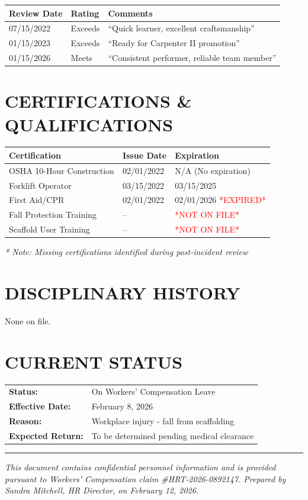 \documentclass[11pt]{article}
\begin{document}
\begin{tabular}{@{}p{3cm}p{3cm}p{8cm}@{}}
\toprule
\textbf{Review Date} & \textbf{Rating} & \textbf{Comments} \\
\midrule
07/15/2022 & Exceeds & ``Quick learner, excellent craftsmanship'' \\
01/15/2023 & Exceeds & ``Ready for Carpenter II promotion'' \\
01/15/2026 & Meets & ``Consistent performer, reliable team member'' \\
\bottomrule
\end{tabular}

\section*{CERTIFICATIONS \& QUALIFICATIONS}

\begin{tabular}{@{}p{6cm}p{4cm}p{4cm}@{}}
\toprule
\textbf{Certification} & \textbf{Issue Date} & \textbf{Expiration} \\
\midrule
OSHA 10-Hour Construction & 02/01/2022 & N/A (No expiration) \\
Forklift Operator & 03/15/2022 & 03/15/2025 \\
First Aid/CPR & 02/01/2022 & 02/01/2026 \textcolor{red}{*EXPIRED*} \\
Fall Protection Training & -- & \textcolor{red}{*NOT ON FILE*} \\
Scaffold User Training & -- & \textcolor{red}{*NOT ON FILE*} \\
\bottomrule
\end{tabular}

\vspace{0.5em}
\small\textit{* Note: Missing certifications identified during post-incident review}

\section*{DISCIPLINARY HISTORY}

None on file.

\section*{CURRENT STATUS}

\begin{tabular}{@{}p{4cm}p{10cm}@{}}
\textbf{Status:} & On Workers' Compensation Leave \\
\textbf{Effective Date:} & February 8, 2026 \\
\textbf{Reason:} & Workplace injury - fall from scaffolding \\
\textbf{Expected Return:} & To be determined pending medical clearance \\
\end{tabular}

\vspace{2em}

\hrule

\vspace{1em}

\small\textit{This document contains confidential personnel information and is provided pursuant to Workers' Compensation claim \#HRT-2026-0892147. Prepared by Sandra Mitchell, HR Director, on February 12, 2026.}
\end{document}
